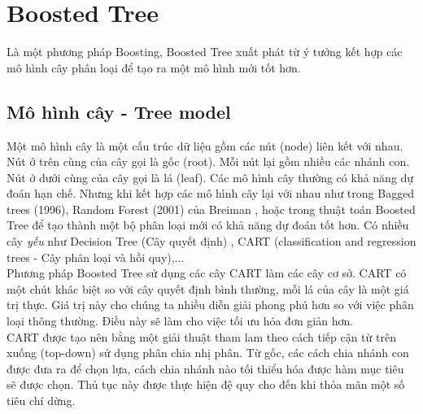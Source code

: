 \section{Boosted Tree}
Là một phương pháp Boosting, Boosted Tree xuất phát từ ý tưởng kết hợp các mô hình cây phân loại để tạo ra một mô hình mới tốt hơn.


\subsection{Mô hình cây - Tree model}
Một mô hình cây là một cấu trúc dữ liệu gồm các nút (node) liên kết với nhau. Nút ở trên cùng của cây gọi là gốc (root). Mỗi nút lại gồm nhiều các nhánh con. Nút ở dưới cùng của cây gọi là lá (leaf). Các mô hình cây thường có khả năng dự đoán hạn chế. Nhưng khi kết hợp các mô hình cây lại với nhau như trong Bagged trees (1996), Random Forest (2001) của Breiman \cite{16}, hoặc trong thuật toán Boosted Tree để tạo thành một bộ phân loại mới có khả năng dự đoán tốt hơn. Có nhiều cây \textit{yếu} như Decision Tree (Cây quyết định) , CART (classification and regression trees - Cây phân loại và hồi quy),... \\
Phương pháp Boosted Tree sử dụng các cây CART làm các cây cơ sở. CART có một chút khác biệt so với cây quyết định bình thường, mỗi lá của cây là một giá trị thực. Giá trị này cho chúng ta nhiều diễn giải phong phú hơn so với việc phân loại thông thường. Điều này sẽ làm cho việc tối ưu hóa đơn giản hơn. \\

CART được tạo nên bằng một giải thuật tham lam theo cách tiếp cận từ trên xuống (top-down) sử dụng phân chia nhị phân. Từ gốc, các cách chia nhánh con được đưa ra để chọn lựa, cách chia nhánh nào tối thiểu hóa được hàm mục tiêu sẽ được chọn. Thủ tục này được thực hiện đệ quy cho đến khi thỏa mãn một số tiêu chí dừng.\\ 



